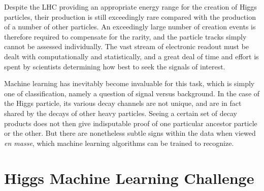 \documentclass          {article} %
\begin{document}
Despite the LHC providing an appropriate energy range for the creation of Higgs particles, their production is still exceedingly rare compared with the production of a number of other particles. An exceedingly large number of creation events is therefore required to compensate for the rarity, and the particle tracks simply cannot be assessed individually. The vast stream of electronic readout must be dealt with computationally and statistically, and a great deal of time and effort is spent by scientists determining how best to seek the signals of interest.

Machine learning has inevitably become invaluable for this task, which is simply one of classification, namely a question of signal versus background. In the case of the Higgs particle, its various decay channels are not unique, and are in fact shared by the decays of other heavy particles. Seeing a certain set of decay products does not then give indisputable proof of one particular ancestor particle or the other. But there are nonetheless subtle signs within the data when viewed \textit{en masse}, which machine learning algorithms can be trained to recognize.




               \section {Higgs Machine Learning Challenge}
               \label   {sec:higgs_machine_learning_challenge}
\end{document}
